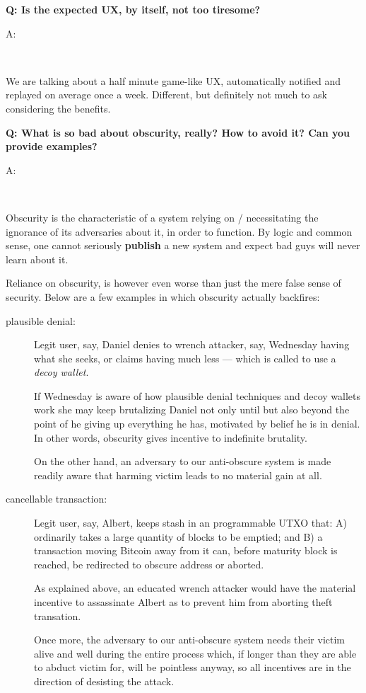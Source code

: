 \documentclass[12pt,a4paper]{article}
\newenvironment{question}[1]{%
  \vspace{0.8em}\noindent\textbf{Q: #1}\par
  \vspace{0.2em}\noindent\begin{itshape}A:\end{itshape}~%
}{\vspace{0.8em}}
\begin{document}
\begin{question}{Is the expected UX, by itself, not too tiresome?}
We are talking about a half minute game-like UX, automatically notified and replayed on average once a week. Different, but definitely not much to ask considering the benefits.
\end{question}

\begin{question}{What is so bad about obscurity, really? How to avoid it? Can you provide examples?}
Obscurity is the characteristic of a system relying on / necessitating the ignorance of its adversaries about it, in order to function. By logic and common sense, one cannot seriously \textbf{publish} a new system and expect bad guys will never learn about it.

Reliance on obscurity, is however even worse than just the mere false sense of security. Below are a few examples in which obscurity actually backfires:
\begin{description}
 \item[plausible denial:] Legit user, say, Daniel denies to wrench attacker, say, Wednesday having what she seeks, or claims having much less --- which is called to use a \textit{decoy wallet}.
 
 If Wednesday is aware of how plausible denial techniques and decoy wallets work she may keep brutalizing Daniel not only until but also beyond the point of he giving up everything he has, motivated by belief he is in denial. In other words, obscurity gives incentive to indefinite brutality.
 
 On the other hand, an adversary to our anti-obscure system is made readily aware that harming victim leads to no material gain at all.
 
 \item[cancellable transaction:] Legit user, say, Albert, keeps stash in an programmable UTXO that: A) ordinarily takes a large quantity of blocks to be emptied; and B) a transaction moving Bitcoin away from it can, before maturity block is reached, be redirected to obscure address or aborted.
 
 As explained above, an educated wrench attacker would have the material incentive to assassinate Albert as to prevent him from aborting theft transation.
 
 Once more, the adversary to our anti-obscure system needs their victim alive and well during the entire process which, if longer than they are able to abduct victim for, will be pointless anyway, so all incentives are in the direction of desisting the attack.
\end{description}

\end{question}
\end{document}
